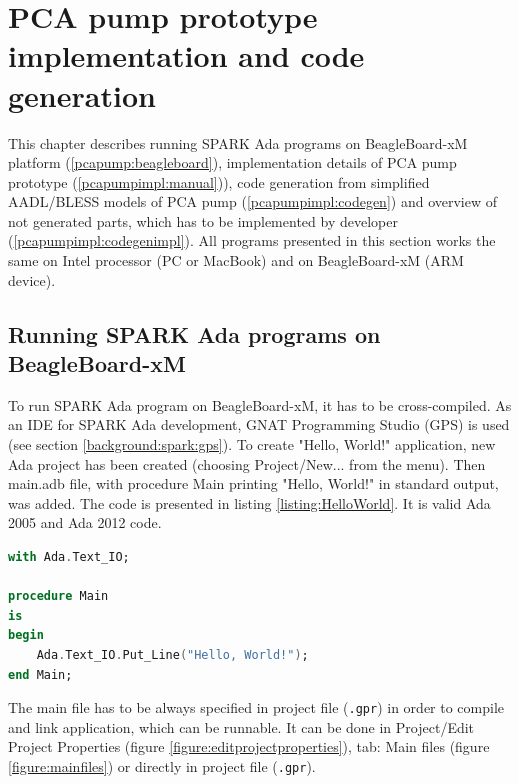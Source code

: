 
\cleardoublepage


\chapter{PCA pump prototype implementation and code generation}
\label{pcapumpimpl}

This chapter describes running SPARK Ada programs on BeagleBoard-xM platform (\ref{pcapump:beagleboard}), implementation details of PCA pump prototype (\ref{pcapumpimpl:manual})), code generation from simplified AADL/BLESS models of PCA pump (\ref{pcapumpimpl:codegen}) and overview of not generated parts, which has to be implemented by developer (\ref{pcapumpimpl:codegenimpl}). All programs presented in this section works the same on Intel processor (PC or MacBook) and on BeagleBoard-xM (ARM device).


\section{Running SPARK Ada programs on BeagleBoard-xM}
\label{pcapumpimpl:beagleboard}

To run SPARK Ada program on BeagleBoard-xM, it has to be cross-compiled. As an IDE for SPARK Ada development, GNAT Programming Studio (GPS) is used (see section \ref{background:spark:gps}). To create "Hello, World!" application, new Ada project has been created (choosing Project/New... from the menu). Then main.adb file, with procedure Main printing "Hello, World!" in standard output, was added. The code is presented in listing \ref{listing:HelloWorld}. It is valid Ada 2005 and Ada 2012 code.

\begin{lstlisting}[language=ada, frame=single, gobble=0, caption={"Hello World" in Ada}]
with Ada.Text_IO;

procedure Main
is
begin
    Ada.Text_IO.Put_Line("Hello, World!");    
end Main;
\end{lstlisting} 
\label{listing:HelloWorld}

The main file has to be always specified in project file (\lstinline{.gpr}) in order to compile and link application, which can be runnable. It can be done in Project/Edit Project Properties (figure \ref{figure:editprojectproperties}), tab: Main files (figure \ref{figure:mainfiles}) or directly in project file (\lstinline{.gpr}).

